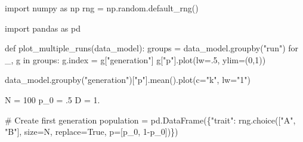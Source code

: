 \documentclass[
  a4paperpaper,
  ,captions=tableheading
]{scrbook}
\newenvironment{Shaded}{\begin{snugshade}}{\end{snugshade}}
\newcommand{\CommentTok}[1]{\textcolor[rgb]{0.37,0.37,0.37}{#1}}
\newcommand{\ControlFlowTok}[1]{\textcolor[rgb]{0.00,0.23,0.31}{#1}}
\newcommand{\DecValTok}[1]{\textcolor[rgb]{0.68,0.00,0.00}{#1}}
\newcommand{\FloatTok}[1]{\textcolor[rgb]{0.68,0.00,0.00}{#1}}
\newcommand{\ImportTok}[1]{\textcolor[rgb]{0.00,0.46,0.62}{#1}}
\newcommand{\KeywordTok}[1]{\textcolor[rgb]{0.00,0.23,0.31}{#1}}
\newcommand{\NormalTok}[1]{\textcolor[rgb]{0.00,0.23,0.31}{#1}}
\newcommand{\OperatorTok}[1]{\textcolor[rgb]{0.37,0.37,0.37}{#1}}
\newcommand{\StringTok}[1]{\textcolor[rgb]{0.13,0.47,0.30}{#1}}
\newcommand{\VariableTok}[1]{\textcolor[rgb]{0.07,0.07,0.07}{#1}}
\begin{document}
\begin{Shaded}
\begin{Highlighting}[]
\ImportTok{import}\NormalTok{ numpy }\ImportTok{as}\NormalTok{ np }
\NormalTok{rng }\OperatorTok{=}\NormalTok{ np.random.default\_rng()}

\ImportTok{import}\NormalTok{ pandas }\ImportTok{as}\NormalTok{ pd}
\end{Highlighting}
\end{Shaded}

\begin{Shaded}
\begin{Highlighting}[]
\KeywordTok{def}\NormalTok{ plot\_multiple\_runs(data\_model):}
\NormalTok{    groups }\OperatorTok{=}\NormalTok{ data\_model.groupby(}\StringTok{"run"}\NormalTok{)}
    \ControlFlowTok{for}\NormalTok{ \_, g }\KeywordTok{in}\NormalTok{ groups:}
\NormalTok{        g.index }\OperatorTok{=}\NormalTok{ g[}\StringTok{"generation"}\NormalTok{]}
\NormalTok{        g[}\StringTok{"p"}\NormalTok{].plot(lw}\OperatorTok{=}\FloatTok{.5}\NormalTok{, ylim}\OperatorTok{=}\NormalTok{(}\DecValTok{0}\NormalTok{,}\DecValTok{1}\NormalTok{))}

\NormalTok{    data\_model.groupby(}\StringTok{"generation"}\NormalTok{)[}\StringTok{"p"}\NormalTok{].mean().plot(c}\OperatorTok{=}\StringTok{"k"}\NormalTok{, lw}\OperatorTok{=}\StringTok{"1"}\NormalTok{)}
\end{Highlighting}
\end{Shaded}

\begin{Shaded}
\begin{Highlighting}[]
\NormalTok{N }\OperatorTok{=} \DecValTok{100}
\NormalTok{p\_0 }\OperatorTok{=} \FloatTok{.5}
\NormalTok{D }\OperatorTok{=} \FloatTok{1.}
\end{Highlighting}
\end{Shaded}

\begin{Shaded}
\begin{Highlighting}[]
\CommentTok{\# Create first generation}
\NormalTok{population }\OperatorTok{=}\NormalTok{ pd.DataFrame(\{}\StringTok{"trait"}\NormalTok{: rng.choice([}\StringTok{"A"}\NormalTok{, }\StringTok{"B"}\NormalTok{], size}\OperatorTok{=}\NormalTok{N, replace}\OperatorTok{=}\VariableTok{True}\NormalTok{, p}\OperatorTok{=}\NormalTok{[p\_0, }\DecValTok{1}\OperatorTok{{-}}\NormalTok{p\_0])\})}
\end{Highlighting}
\end{Shaded}
\end{document}
